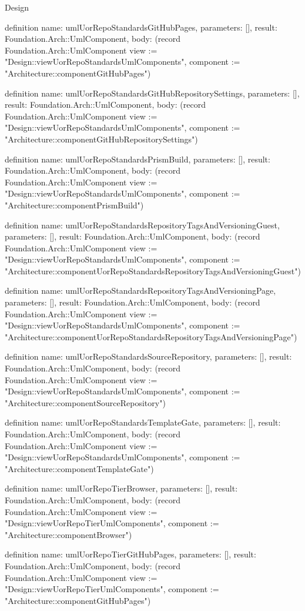 \begin{lexlean}{Design}
\begin{semanticmodule}
definition{
  name: umlUorRepoStandardsGitHubPages,
  parameters: [],
  result: Foundation.Arch::UmlComponent,
  body: (record Foundation.Arch::UmlComponent {view := "Design::viewUorRepoStandardsUmlComponents", component := "Architecture::componentGitHubPages"})
}

definition{
  name: umlUorRepoStandardsGitHubRepositorySettings,
  parameters: [],
  result: Foundation.Arch::UmlComponent,
  body: (record Foundation.Arch::UmlComponent {view := "Design::viewUorRepoStandardsUmlComponents", component := "Architecture::componentGitHubRepositorySettings"})
}

definition{
  name: umlUorRepoStandardsPrismBuild,
  parameters: [],
  result: Foundation.Arch::UmlComponent,
  body: (record Foundation.Arch::UmlComponent {view := "Design::viewUorRepoStandardsUmlComponents", component := "Architecture::componentPrismBuild"})
}

definition{
  name: umlUorRepoStandardsRepositoryTagsAndVersioningGuest,
  parameters: [],
  result: Foundation.Arch::UmlComponent,
  body: (record Foundation.Arch::UmlComponent {view := "Design::viewUorRepoStandardsUmlComponents", component := "Architecture::componentUorRepoStandardsRepositoryTagsAndVersioningGuest"})
}

definition{
  name: umlUorRepoStandardsRepositoryTagsAndVersioningPage,
  parameters: [],
  result: Foundation.Arch::UmlComponent,
  body: (record Foundation.Arch::UmlComponent {view := "Design::viewUorRepoStandardsUmlComponents", component := "Architecture::componentUorRepoStandardsRepositoryTagsAndVersioningPage"})
}

definition{
  name: umlUorRepoStandardsSourceRepository,
  parameters: [],
  result: Foundation.Arch::UmlComponent,
  body: (record Foundation.Arch::UmlComponent {view := "Design::viewUorRepoStandardsUmlComponents", component := "Architecture::componentSourceRepository"})
}

definition{
  name: umlUorRepoStandardsTemplateGate,
  parameters: [],
  result: Foundation.Arch::UmlComponent,
  body: (record Foundation.Arch::UmlComponent {view := "Design::viewUorRepoStandardsUmlComponents", component := "Architecture::componentTemplateGate"})
}

definition{
  name: umlUorRepoTierBrowser,
  parameters: [],
  result: Foundation.Arch::UmlComponent,
  body: (record Foundation.Arch::UmlComponent {view := "Design::viewUorRepoTierUmlComponents", component := "Architecture::componentBrowser"})
}

definition{
  name: umlUorRepoTierGitHubPages,
  parameters: [],
  result: Foundation.Arch::UmlComponent,
  body: (record Foundation.Arch::UmlComponent {view := "Design::viewUorRepoTierUmlComponents", component := "Architecture::componentGitHubPages"})
}


\end{semanticmodule}
\end{lexlean}
